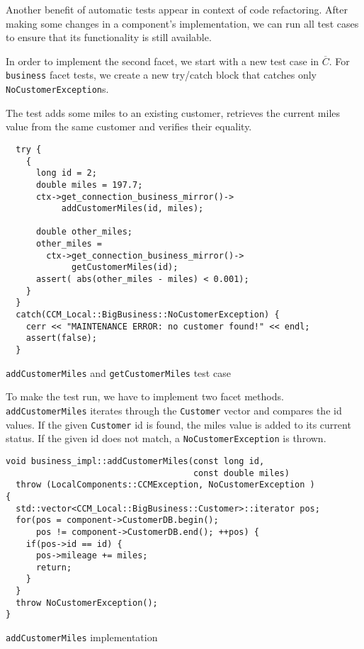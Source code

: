 Another benefit of automatic tests appear in context of code refactoring. 
After making some changes in a component's implementation, we can run all test 
cases to ensure that its functionality is still available.

\newpage

In order to implement the second facet, we start with a new test case in 
$\overline{C}$.
For {\tt business} facet tests, we create a new try/catch block that catches
only {\tt NoCustomerException}s.
 
The test adds some miles to an existing customer, retrieves the current miles 
value from the same customer and verifies their equality. 
\begin{Example}
\begin{minifbox}
\begin{small}
\begin{verbatim}
  try {
    {
      long id = 2;
      double miles = 197.7;
      ctx->get_connection_business_mirror()->
           addCustomerMiles(id, miles); 

      double other_miles;
      other_miles = 
        ctx->get_connection_business_mirror()->
             getCustomerMiles(id); 
      assert( abs(other_miles - miles) < 0.001);
    }
  }
  catch(CCM_Local::BigBusiness::NoCustomerException) {
    cerr << "MAINTENANCE ERROR: no customer found!" << endl;
    assert(false);
  }
\end{verbatim}
\end{small}
\end{minifbox}
\caption{{\tt addCustomerMiles} and {\tt getCustomerMiles} test case}
\label{example:}
\end{Example}


To make the test run, we have to implement two facet methods.
{\tt addCustomerMiles} iterates through the {\tt Customer} vector
and compares the id values.
If the given {\tt Customer} id is found, the miles value is added to
its current status.
If the given id does not match, a {\tt NoCustomerException} is thrown.
\begin{Example}
\begin{minifbox}
\begin{small}
\begin{verbatim}
void business_impl::addCustomerMiles(const long id, 
                                     const double miles)
  throw (LocalComponents::CCMException, NoCustomerException )
{
  std::vector<CCM_Local::BigBusiness::Customer>::iterator pos;
  for(pos = component->CustomerDB.begin(); 
      pos != component->CustomerDB.end(); ++pos) {
    if(pos->id == id) {
      pos->mileage += miles;
      return;
    }
  }
  throw NoCustomerException();    
}
\end{verbatim}
\end{small}
\end{minifbox}
\caption{{\tt addCustomerMiles} implementation}
\label{example:}
\end{Example}

